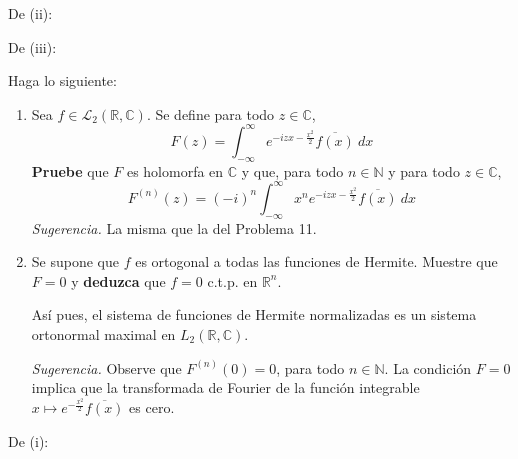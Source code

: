 \documentclass[12pt]{report}
\theoremstyle{largebreak}
\newcommand\conj[1]{\ensuremath{\overline{#1}}}
\begin{document}
\begin{sol}
        De (ii): %

        De (iii): 
    \end{sol}

    \begin{excer}
        Haga lo siguiente:
        \begin{enumerate}
            \item Sea $f\in\mathcal{L}_2(\mathbb{R},\mathbb{C})$. Se define para todo $z\in\mathbb{C}$,
            \begin{equation*}
                F(z)=\int_{-\infty}^{\infty}e^{ -izx-\frac{x^2}{2}}\conj{f(x)}\:dx
            \end{equation*}
            \textbf{Pruebe} que $F$ es holomorfa en $\mathbb{C}$ y que, para todo $n\in\mathbb{N}$ y para todo $z\in\mathbb{C}$,
            \begin{equation*}
                F^{(n)}(z)=(-i)^n\int_{-\infty}^\infty x^ne^{ -izx-\frac{x^2}{2}}\conj{f(x)}\:dx
            \end{equation*}
            \textit{Sugerencia.} La misma que la del Problema 11.
            \item Se supone que $f$ es ortogonal a todas las funciones de Hermite. Muestre que $F=0$ y \textbf{deduzca} que $f=0$ c.t.p. en $\mathbb{R}^n$.
            
            Así pues, el sistema de funciones de Hermite normalizadas es un sistema ortonormal maximal en $L_2(\mathbb{R},\mathbb{C})$.

            \textit{Sugerencia.} Observe que $F^{(n)}(0)=0$, para todo $n\in\mathbb{N}$. La condición $F=0$ implica que la transformada de Fourier de la función integrable $x\mapsto e^{ -\frac{x^2}{2}}\conj{f(x)}$ es cero.
        \end{enumerate}
    \end{excer}

    \begin{sol}
        De (i): 
    \end{sol}
\end{document}
